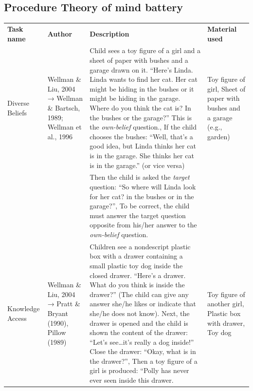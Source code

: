\documentclass[
  man,floatsintext]{apa7}
\begin{document}
\hypertarget{procedure-theory-of-mind-battery}{%
\subsection{Procedure Theory of mind battery}\label{procedure-theory-of-mind-battery}}

\begin{longtable}[]{@{}
  >{\raggedright\arraybackslash}p{}
  >{\raggedright\arraybackslash}p{}
  >{\raggedright\arraybackslash}p{}
  >{\raggedright\arraybackslash}p{}@{}}
\toprule\noalign{}
\endhead
\bottomrule\noalign{}
\endlastfoot
\textbf{Task name} & \textbf{Author} & \textbf{Description} & \textbf{Material used} \\
Diverse Beliefs & Wellman \& Liu, 2004 → Wellman \& Bartsch, 1989; Wellman et al., 1996 & Child sees a toy figure of a girl and a sheet of paper with bushes and a garage drawn on it. ``Here's Linda. Linda wants to find her cat. Her cat might be hiding in the bushes or it might be hiding in the garage. Where do you think the cat is? In the bushes or the garage?'' This is the \emph{own-belief} question., If the child chooses the bushes: ``Well, that's a good idea, but Linda thinks her cat is in the garage. She thinks her cat is in the garage.'' (or vice versa) & Toy figure of girl, Sheet of paper with bushes and a garage (e.g., garden) \\
& & Then the child is asked the \emph{target} question: ``So where will Linda look for her cat? in the bushes or in the garage?'', To be correct, the child must answer the target question opposite from his/her answer to the \emph{own-belief} question. & \\
Knowledge Access & Wellman \& Liu, 2004 → Pratt \& Bryant (1990), Pillow (1989) & Children see a nondescript plastic box with a drawer containing a small plastic toy dog inside the closed drawer. ``Here's a drawer. What do you think is inside the drawer?'' (The child can give any answer she/he likes or indicate that she/he does not know). Next, the drawer is opened and the child is shown the content of the drawer: ``Let's see\ldots it's really a dog inside!'' Close the drawer: ``Okay, what is in the drawer?'', Then a toy figure of a girl is produced: ``Polly has never ever seen inside this drawer. & Toy figure of another girl, Plastic box with drawer, Toy dog \\

\end{longtable}
\end{document}
